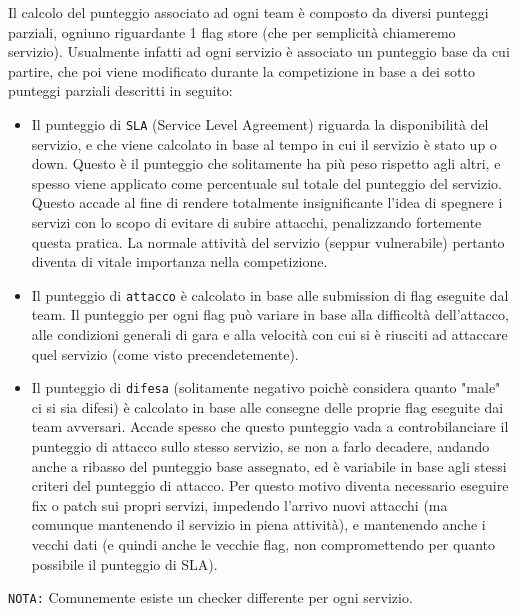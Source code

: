Il calcolo del punteggio associato ad ogni team è composto da diversi punteggi parziali, ogniuno riguardante 1 flag store (che per semplicità chiameremo servizio).
Usualmente infatti ad ogni servizio è associato un punteggio base da cui partire, che poi viene modificato durante la competizione in base a dei sotto punteggi parziali descritti in seguito:
\begin{itemize}
    \setlength{\itemsep}{5pt}
    \setlength{\parskip}{5pt}
    \item Il punteggio di \texttt{SLA} (Service Level Agreement) riguarda la disponibilità del servizio, e che viene calcolato in base al tempo in cui il servizio è stato up o down.
    Questo è il punteggio che solitamente ha più peso rispetto agli altri, e spesso viene applicato come percentuale sul totale del punteggio del servizio. Questo accade al fine di
    rendere totalmente insignificante l'idea di spegnere i servizi con lo scopo di evitare di subire attacchi, penalizzando fortemente questa pratica.
    La normale attività del servizio (seppur vulnerabile) pertanto diventa di vitale importanza nella competizione.
    \item Il punteggio di \texttt{attacco} è calcolato in base alle submission di flag eseguite dal team. Il punteggio per ogni flag può variare in base alla difficoltà dell'attacco,
    alle condizioni generali di gara e alla velocità con cui si è riusciti ad attaccare quel servizio (come visto precendetemente).
    \item Il punteggio di \texttt{difesa} (solitamente negativo poichè considera quanto "male" ci si sia difesi) è calcolato in base alle consegne
    delle proprie flag eseguite dai team avversari. Accade spesso che questo punteggio vada a controbilanciare il punteggio di attacco sullo stesso servizio, se non a farlo decadere, andando anche a
    ribasso del punteggio base assegnato, ed è variabile in base agli stessi criteri del punteggio di attacco. Per questo motivo diventa necessario eseguire
    fix o patch sui propri servizi, impedendo l'arrivo nuovi attacchi (ma comunque mantenendo il servizio in piena attività),
    e mantenendo anche i vecchi dati (e quindi anche le vecchie flag, non compromettendo per quanto possibile il punteggio di SLA).
\end{itemize}

\texttt{NOTA:} Comunemente esiste un checker differente per ogni servizio.

\vspace{\fill}
\newpage

